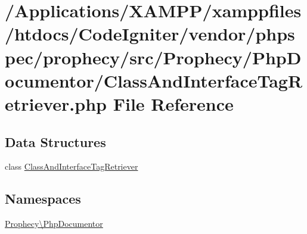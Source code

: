 \hypertarget{_class_and_interface_tag_retriever_8php}{}\section{/\+Applications/\+X\+A\+M\+P\+P/xamppfiles/htdocs/\+Code\+Igniter/vendor/phpspec/prophecy/src/\+Prophecy/\+Php\+Documentor/\+Class\+And\+Interface\+Tag\+Retriever.php File Reference}
\label{_class_and_interface_tag_retriever_8php}
\subsection*{Data Structures}
\begin{DoxyCompactItemize}
\item 
class \mbox{\hyperlink{class_prophecy_1_1_php_documentor_1_1_class_and_interface_tag_retriever}{Class\+And\+Interface\+Tag\+Retriever}}
\end{DoxyCompactItemize}
\subsection*{Namespaces}
\begin{DoxyCompactItemize}
\item 
 \mbox{\hyperlink{namespace_prophecy_1_1_php_documentor}{Prophecy\textbackslash{}\+Php\+Documentor}}
\end{DoxyCompactItemize}
